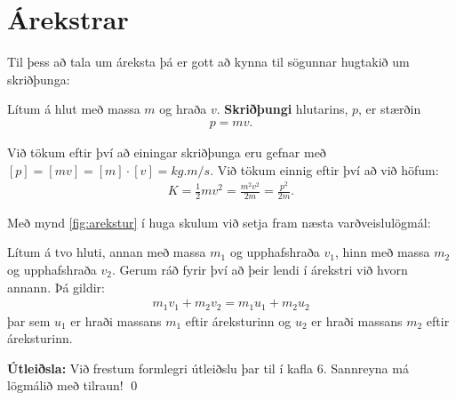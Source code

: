\ifdefined \wholebook \else\documentclass[oneside]{book}\usepackage{EdlBook}\graphicspath{{figures/}}
\begin{document}
\newpage

\section{Árekstrar}

Til þess að tala um áreksta þá er gott að kynna til sögunnar hugtakið um skriðþunga:

\begin{tcolorbox}
\begin{definition}
Lítum á hlut með massa $m$ og hraða $v$. \textbf{Skriðþungi} hlutarins, $p$, er stærðin
\begin{align*}
    p = mv.
\end{align*}
\end{definition}
\end{tcolorbox}
Við tökum eftir því að einingar skriðþunga eru gefnar með $[
p] = [mv] = [m] \cdot [v] = \si{kg.m/s}$. Við tökum einnig eftir því að við höfum:
\begin{align*}
    K = \frac{1}{2}mv^2 = \frac{m^2 v^2}{2m} = \frac{p^2}{2m}.
\end{align*}

Með mynd \ref{fig:arekstur} í huga skulum við setja fram næsta varðveislulögmál:

\begin{tcolorbox}
\begin{theorem}
Lítum á tvo hluti, annan með massa $m_1$ og upphafshraða $v_1$, hinn með massa $m_2$ og upphafshraða $v_2$. Gerum ráð fyrir því að þeir lendi í árekstri við hvorn annann. Þá gildir:
\begin{align*}
    m_1 v_1 + m_2 v_2 = m_1 u_1 + m_2 u_2
\end{align*}
þar sem $u_1$ er hraði massans $m_1$ eftir áreksturinn og $u_2$ er hraði massans $m_2$ eftir áreksturinn.
\end{theorem}
\end{tcolorbox}

\textbf{Útleiðsla:} Við frestum formlegri útleiðslu þar til í kafla 6. Sannreyna má lögmálið með tilraun! \qed
\end{document}
